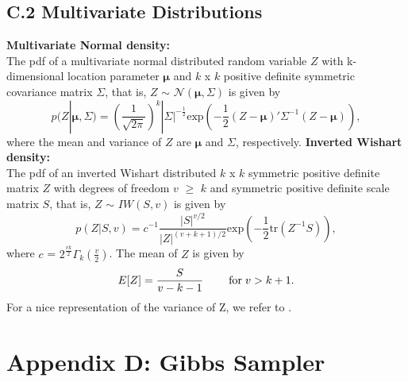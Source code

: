 \subsection*{C.2 \hspace{0.1cm} Multivariate Distributions} 
\textbf{Multivariate Normal density:} \\ 
 The pdf of a multivariate normal distributed random variable $Z$ with k-dimensional location parameter $\pmb{\mu}$ and $k$ x $k$ positive definite symmetric covariance matrix $\Sigma$, that is, $Z$ $\sim$ $\mathcal{N}(\pmb{\mu},\Sigma )$ is given by 
     \begin{equation} 
     p(Z|\pmb{\mu},\Sigma) = \left(\frac{1}{\sqrt{2\pi}}\right)^k |\Sigma|^{-\frac{1}{2}} \text{exp}(-\frac{1}{2}(Z-\pmb{\mu})'\Sigma^{-1}(Z-\pmb{\mu})),  
     \end{equation} 
     where the mean and variance of $Z$ are $\pmb{\mu}$ and $\Sigma$, respectively.
\bigskip \newline 
\noindent  \textbf{Inverted Wishart density:}\\
The pdf of an inverted Wishart distributed $k$ x $k$ symmetric positive definite matrix $Z$ with degrees of freedom $v$ $\geq$ $k$ and symmetric positive definite scale matrix $S$, that is, $Z$ $\sim$ $IW(S,v)$ is given by 
     \begin{equation}
         p(Z|S,v) = c^{-1} \frac{|S|^{v/2}}{|Z|^{(v+k+1)/2}} \text{exp}\left(-\frac{1}{2}\text{tr}(Z^{-1}S)\right),
     \end{equation}
     where $c$ = $2^{\frac{vk}{2}}\Gamma_k\left(\frac{v}{2}\right)$.
     The mean of $Z$ is given by
      \begin{equation*}
         E[Z] = \frac{S}{v-k-1} \hspace{0.8cm} \text{for} \hspace{0.1cm} v > k + 1. 
     \end{equation*} 
     For a nice representation of the variance of Z, we refer to \citet{nydick2012wishart}. 


\newpage 

\newpage
\section*{Appendix D: Gibbs Sampler}


